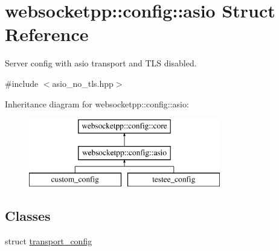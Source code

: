 \hypertarget{structwebsocketpp_1_1config_1_1asio}{}\section{websocketpp\+:\+:config\+:\+:asio Struct Reference}
\label{structwebsocketpp_1_1config_1_1asio}


Server config with asio transport and T\+LS disabled.  




{\ttfamily \#include $<$asio\+\_\+no\+\_\+tls.\+hpp$>$}

Inheritance diagram for websocketpp\+:\+:config\+:\+:asio\+:\begin{figure}[H]
\begin{center}
\leavevmode
\includegraphics[height=3.000000cm]{structwebsocketpp_1_1config_1_1asio}
\end{center}
\end{figure}
\subsection*{Classes}
\begin{DoxyCompactItemize}
\item 
struct \hyperlink{structwebsocketpp_1_1config_1_1asio_1_1transport__config}{transport\+\_\+config}
\end{DoxyCompactItemize}
